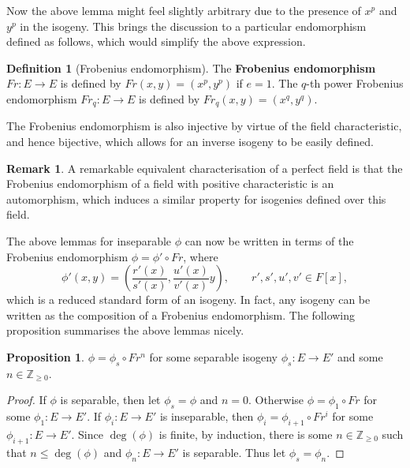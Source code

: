 \documentclass{article}
\newcommand{\Z}{\mathbb{Z}}
\newcommand{\rb}[1]{\left( #1 \right)}
\renewcommand{\sb}[1]{\left[ #1 \right]}
\theoremstyle{definition}
\newtheorem*{definition}{Definition}
\newtheorem*{remark}{Remark}
\newtheorem{proposition}{Proposition}[subsection]
\begin{document}
Now the above lemma might feel slightly arbitrary due to the presence of $ x^p $ and $ y^p $ in the isogeny. This brings the discussion to a particular endomorphism defined as follows, which would simplify the above expression.

\begin{definition}[Frobenius endomorphism]
The \textbf{Frobenius endomorphism} $ Fr : E \to E $ is defined by $ Fr\rb{x, y} = \rb{x^p, y^p} $ if $ e = 1 $. The $ q $-th power Frobenius endomorphism $ Fr_q : E \to E $ is defined by $ Fr_q\rb{x, y} = \rb{x^q, y^q} $.
\end{definition}

The Frobenius endomorphism is also injective by virtue of the field characteristic, and hence bijective, which allows for an inverse isogeny to be easily defined.

\begin{remark}
A remarkable equivalent characterisation of a perfect field is that the Frobenius endomorphism of a field with positive characteristic is an automorphism, which induces a similar property for isogenies defined over this field.
\end{remark}

The above lemmas for inseparable $ \phi $ can now be written in terms of the Frobenius endomorphism $ \phi = \phi' \circ Fr $, where
$$ \phi'\rb{x, y} = \rb{\dfrac{r'\rb{x}}{s'\rb{x}}, \dfrac{u'\rb{x}}{v'\rb{x}}y}, \qquad r', s', u', v' \in F\sb{x}, $$
which is a reduced standard form of an isogeny. In fact, any isogeny can be written as the composition of a Frobenius endomorphism. The following proposition summarises the above lemmas nicely.

\begin{proposition}
$ \phi = \phi_s \circ Fr^n $ for some separable isogeny $ \phi_s : E \to E' $ and some $ n \in \Z_{\ge 0} $.
\end{proposition}

\begin{proof}
If $ \phi $ is separable, then let $ \phi_s = \phi $ and $ n = 0 $. Otherwise $ \phi = \phi_1 \circ Fr $ for some $ \phi_1 : E \to E' $. If $ \phi_i : E \to E' $ is inseparable, then $ \phi_i = \phi_{i + 1} \circ Fr^i $ for some $ \phi_{i + 1} : E \to E' $. Since $ \deg\rb{\phi} $ is finite, by induction, there is some $ n \in \Z_{\ge 0} $ such that $ n \le \deg\rb{\phi} $ and $ \phi_n : E \to E' $ is separable. Thus let $ \phi_s = \phi_n $.
\end{proof}
\end{document}

